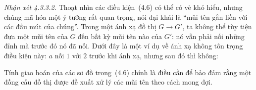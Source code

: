 \noindent\textit{Nhận xét 4.3.3.2.} Thoạt nhìn các điều kiện~(4.6) có thể có vẻ khó hiểu, nhưng chúng mã hóa một ý tưởng rất quan trọng, nói đại khái là ``mũi tên gắn liền với các đầu mút của chúng''. Trong một ánh xạ đồ thị $G\to G'$, ta không thể tùy tiện đưa một mũi tên của $G$ đến bất kỳ mũi tên nào của $G'$: nó vẫn phải nối những đỉnh mà trước đó nó đã nối. Dưới đây là một ví dụ về ánh xạ không tôn trọng điều kiện này: $a$ nối $1$ với $2$ trước khi ánh xạ, nhưng sau đó thì không:
\begin{center}
\end{center}
Tính giao hoán của các sơ đồ trong~(4.6) chính là điều cần để bảo đảm rằng một đồng cấu đồ thị được đề xuất xử lý các mũi tên theo cách mong đợi.

